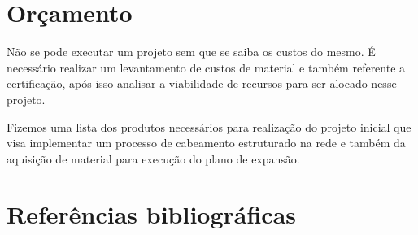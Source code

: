 \documentclass[12pt, a4paper]{article}
\begin{document}
	\section{Orçamento}
	Não se pode executar um projeto sem que se saiba os custos do mesmo. É necessário realizar um levantamento de custos de material e também referente a certificação, após isso analisar a viabilidade de recursos para ser alocado nesse projeto.
	\par 
	Fizemos uma lista dos produtos necessários para realização do projeto inicial que visa implementar um processo de cabeamento estruturado na rede e também da aquisição de material para execução do plano de expansão.
	\FloatBarrier
	
	\FloatBarrier
	\section{Referências bibliográficas}
	
	
\end{document}
